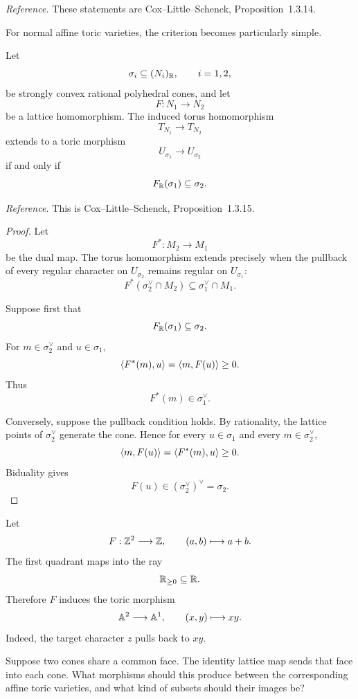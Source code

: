 \noindent
\textit{Reference.}
These statements are Cox--Little--Schenck,
Proposition~1.3.14.

For normal affine toric varieties, the criterion becomes particularly
simple.

\begin{proposition}
\label{prop:cone-criterion-toric-morphism}
Let
\[
\sigma_i\subseteq(N_i)_{\mathbb{R}},
\qquad
i=1,2,
\]
be strongly convex rational polyhedral cones, and let
\[
F:N_1\longrightarrow N_2
\]
be a lattice homomorphism. The induced torus homomorphism
\[
T_{N_1}\longrightarrow T_{N_2}
\]
extends to a toric morphism
\[
U_{\sigma_1}\longrightarrow U_{\sigma_2}
\]
if and only if
\[
F_{\mathbb{R}}(\sigma_1)\subseteq\sigma_2.
\]
\end{proposition}

\noindent
\textit{Reference.}
This is Cox--Little--Schenck, Proposition~1.3.15.

\begin{proof}
Let
\[
F^*:M_2\longrightarrow M_1
\]
be the dual map. The torus homomorphism extends precisely when the
pullback of every regular character on \(U_{\sigma_2}\) remains
regular on \(U_{\sigma_1}\):
\[
F^*(\sigma_2^\vee\cap M_2)
\subseteq
\sigma_1^\vee\cap M_1.
\]

Suppose first that
\[
F_{\mathbb{R}}(\sigma_1)\subseteq\sigma_2.
\]
For \(m\in\sigma_2^\vee\) and \(u\in\sigma_1\),
\[
\left\langle F^*(m),u\right\rangle
=
\left\langle m,F(u)\right\rangle
\geq0.
\]
Thus
\[
F^*(m)\in\sigma_1^\vee.
\]

Conversely, suppose the pullback condition holds. By rationality, the
lattice points of \(\sigma_2^\vee\) generate the cone. Hence for every
\(u\in\sigma_1\) and every \(m\in\sigma_2^\vee\),
\[
\left\langle m,F(u)\right\rangle
=
\left\langle F^*(m),u\right\rangle
\geq0.
\]
Biduality gives
\[
F(u)\in(\sigma_2^\vee)^\vee=\sigma_2.
\]
\end{proof}

\begin{example}
Let
\[
F:\mathbb{Z}^2\longrightarrow\mathbb{Z},
\qquad
(a,b)\longmapsto a+b.
\]
The first quadrant maps into the ray
\[
\mathbb{R}_{\geq0}\subseteq\mathbb{R}.
\]
Therefore \(F\) induces the toric morphism
\[
\mathbb{A}^2\longrightarrow\mathbb{A}^1,
\qquad
(x,y)\longmapsto xy.
\]
Indeed, the target character \(z\) pulls back to \(xy\).
\end{example}

\begin{prediction}
Suppose two cones share a common face. The identity lattice map sends
that face into each cone. What morphisms should this produce between
the corresponding affine toric varieties, and what kind of subsets
should their images be?
\end{prediction}

